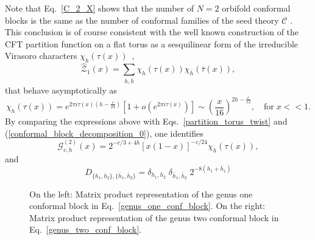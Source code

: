\documentclass[a4paper,11pt]{article}
\begin{document}
Note that Eq.~\eqref{C_2_X} shows that the number of $N=2$ orbifold conformal blocks is the same as the number
of conformal families of the seed theory $\mathcal{C}$ . This conclusion is of course consistent with
the well known construction of the CFT partition function on a flat torus as a sesquilinear form of the
irreducible Virasoro characters $\chi_{h}(\tau(x))$~\cite{Cappelli, Cappelli2},
\begin{equation}
\mathcal{\hat{Z}}_1(x) = \sum_{h,\bar{h}} \chi_{h}(\tau(x)) \chi_{\bar{h}}(\bar{\tau}(x)),
\end{equation}
that behave asymptotically as
\begin{equation}
\chi_{h}(\tau(x)) = e^{2\pi i \tau(x)\left(h-\frac{c}{24}\right)}\left[1+ o\left(e^{2\pi i \tau(x)}\right)\right] \sim \left(\frac{x}{16}\right)^{ 2 h-\frac{c}{12}}, \quad \text{for}\; x<<1.
\end{equation}
 By comparing the expressions above with Eqs.~\eqref{partition_torus_twist} and (\ref{conformal_block_decomposition_0}), one identifies 
\begin{equation}\label{character_conf_block}
\mathcal{G}_{c,h}^{(2)}(x)=2^{-c/3+4 h}[x(1-x)]^{-c/24}\chi_{h}(\tau(x)),
\end{equation}
and 
\begin{equation}
 D_{\{ h_1, h_2 \}, \{ \bar{h}_1,\bar{h}_2\} } =\delta_{h_1,h_2}\;\delta_{\bar{h}_1,\bar{h}_2} \;2^{-8 (h_1+\bar{h}_1)}
\end{equation}



\begin{figure}[t]
\centering
\caption{On the left: Matrix product representation of the genus one conformal block in Eq.~\eqref{genus_one_conf_block}. On the right: Matrix product representation of the genus two conformal block in Eq.~\eqref{genus_two_conf_block}.}
\label{fig-g1}
\end{figure}
\end{document}
